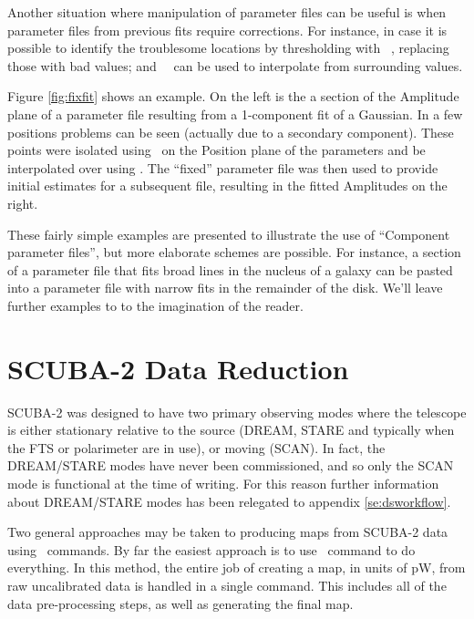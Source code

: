 \documentclass[oneside,11pt]{starlink}
\begin{document}
Another situation where manipulation of parameter files can be useful
is when parameter files from previous fits require corrections. For
instance, in case it is possible to identify the troublesome locations
by thresholding with \KAPPA\ \thresh, replacing those with bad values; and
\KAPPA\ \fillbad\ can be used to interpolate from surrounding values.

Figure \ref{fig:fixfit} shows an example. On the left is the a section
of the Amplitude plane of a parameter file resulting from a
1-component fit of a Gaussian. In a few positions problems can be seen
(actually due to a secondary component).  These points were isolated
using \thresh\ on the Position plane of the parameters and be
interpolated over using \fillbad. The ``fixed'' parameter file was
then used to provide initial estimates for a subsequent file,
resulting in the fitted Amplitudes on the right.

\begin{terminalv}
\end{terminalv}

These fairly simple examples are presented to illustrate the use of
``Component parameter files'', but more elaborate schemes are
possible. For instance, a section of a parameter file that fits broad
lines in the nucleus of a galaxy can be pasted into a parameter file
with narrow fits in the remainder of the disk. We'll leave further
examples to to the imagination of the reader.

\section{SCUBA-2 Data Reduction\label{se:sc2dr}}

SCUBA-2 was designed to have two primary observing modes where the
telescope is either stationary relative to the source (DREAM, STARE
and typically when the FTS or polarimeter are in use), or moving (SCAN).
In fact, the DREAM/STARE modes have never been commissioned, and so only the
SCAN mode is functional at the time of writing.  For this reason further
information about DREAM/STARE modes has been relegated to appendix
\ref{se:dsworkflow}.

Two general approaches may be taken to producing maps from SCUBA-2 data
using \SMURF\ commands. By far the easiest approach is to use \makemap\
command to do everything. In this method, the entire job of creating a
map, in units of pW, from raw uncalibrated data is handled in a single
command. This includes all of the data pre-processing steps, as well as
generating the final map.
\end{document}
